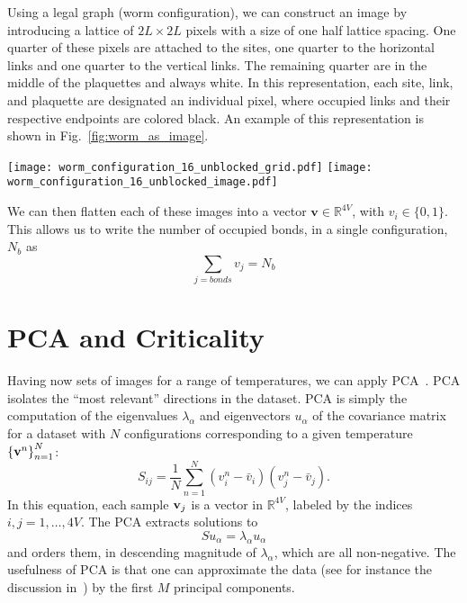 \documentclass[../main.tex]{subfiles}
\begin{document}
Using a legal graph (worm configuration), we can construct an image by
introducing a lattice of $2L\times2L$  pixels with a size of one half lattice
spacing.  One quarter of these pixels are attached to the sites, one quarter to
the horizontal links and one quarter to the vertical links. The remaining
quarter are in the middle of the plaquettes and always white.  In this
representation, each site, link, and plaquette are designated an individual
pixel, where occupied links and their respective endpoints are colored black.
An example of this representation is shown in
Fig.~\ref{fig:worm_as_image}.
%
\begin{figure*}[htpb]
 \centering
 \texttt{[image: worm\_configuration\_16\_unblocked\_grid.pdf]}
 \hfill
 \texttt{[image: worm\_configuration\_16\_unblocked\_image.pdf]}
 \caption{(a) Legal worm configuration on an $L \times L$ lattice with periodic
		boundary conditions and; (b) its equivalent representation as a
		$2L\times2L$ black and white pixel image.}%
 \label{fig:worm_as_image}
\end{figure*}
%
We can then flatten each of these images into a vector $\mathbf{v} \in
\mathbb{R}^{4V}$, with $v_i \in \{0, 1\}$.
%
This allows us to write the number of occupied bonds, in a single
configuration, $N_b$ as
%
\begin{equation}
    \sum_{j = bonds} v_j = N_b
    \label{eq:link_sum}
\end{equation}
%
\section{PCA and Criticality}%
\label{sec:pca}
Having now sets of images for a range of temperatures, we can apply
PCA~\cite{Bishop}.
%
PCA isolates the ``most relevant'' directions in the dataset.
%
PCA is simply the computation of the eigenvalues $\lambda_\alpha$ and
eigenvectors $u_\alpha$ of the covariance matrix for a dataset with $N$
configurations corresponding to a given temperature ${\{{\bf v}^n\}}_{n=1}^N$:
%
\begin{equation}
S_{ij} = \frac{1}{N} \sum_{n=1}^N (v_{i}^n - {\bar v}_i)
(v_{j}^n - {\bar v}_j).
\end{equation}
%
In this equation, each sample ${\bf v}_j$ is a vector in $\mathbb{R}^{4V}$,
labeled by the indices $i,j = 1,\ldots,4V$.
%
The PCA extracts solutions to
%
\begin{equation}
S u_\alpha = \lambda_\alpha u_\alpha
\end{equation}
%
and orders them, in descending magnitude of $\lambda_\alpha$, which are all
non-negative.
%
The usefulness of PCA is that one can approximate the data (see for instance
the discussion in~\cite{Bishop}) by the first $M$ principal components. 
\end{document}
